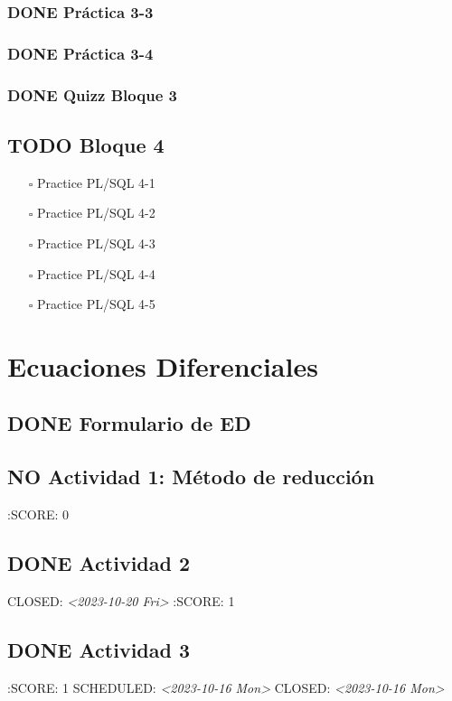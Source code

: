 \documentclass[11pt]{article}
\begin{document}
\subsubsection{{\bfseries\sffamily DONE} Práctica 3-3}
\label{sec:org94db5e3}
\subsubsection{{\bfseries\sffamily DONE} Práctica 3-4}
\label{sec:org31a03c0}
\subsubsection{{\bfseries\sffamily DONE} Quizz Bloque 3}
\label{sec:orgda94008}
\subsection{{\bfseries\sffamily TODO} Bloque 4}
\label{sec:org9780baa}
\begin{itemize}
\item[{$\square$}] Practice PL/SQL 4-1
\item[{$\square$}] Practice PL/SQL 4-2
\item[{$\square$}] Practice PL/SQL 4-3
\item[{$\square$}] Practice PL/SQL 4-4
\item[{$\square$}] Practice PL/SQL 4-5
\end{itemize}
\section{Ecuaciones Diferenciales}
\label{sec:org7ceffb5}
\subsection{{\bfseries\sffamily DONE} Formulario de ED}
\label{sec:orgbec7b1c}
\subsection{{\bfseries\sffamily NO} Actividad 1: Método de reducción}
\label{sec:org0cd3c36}
:SCORE: 0
\subsection{{\bfseries\sffamily DONE} Actividad 2}
\label{sec:orgb660a9d}
CLOSED: \textit{<2023-10-20 Fri>}
:SCORE: 1
\subsection{{\bfseries\sffamily DONE} Actividad 3}
\label{sec:org851411b}
:SCORE: 1
SCHEDULED: \textit{<2023-10-16 Mon>}
CLOSED: \textit{<2023-10-16 Mon>}
\end{document}
